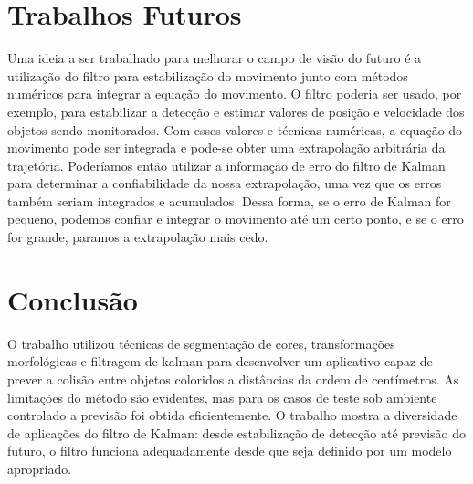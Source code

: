 \documentclass[journal]{IEEEtran}
\begin{document}
\section{Trabalhos Futuros}

Uma ideia a ser trabalhado para melhorar o campo de visão do futuro é a utilização
do filtro para estabilização do movimento junto com métodos numéricos para integrar
a equação do movimento. O filtro poderia ser usado, por exemplo, para estabilizar
a detecção e estimar valores de posição e velocidade dos objetos sendo monitorados.
Com esses valores e técnicas numéricas, a equação do movimento pode ser integrada
e pode-se obter uma extrapolação arbitrária da trajetória. Poderíamos então utilizar
a informação de erro do filtro de Kalman para determinar a confiabilidade da nossa
extrapolação, uma vez que os erros também seriam integrados e acumulados. Dessa forma,
se o erro de Kalman for pequeno, podemos confiar e integrar o movimento até um certo ponto, 
e se o erro for grande, paramos a extrapolação mais cedo.



\section{Conclusão}
O trabalho utilizou técnicas de segmentação de cores, transformações morfológicas
e filtragem de kalman para desenvolver um aplicativo capaz de prever a colisão entre
objetos coloridos a distâncias da ordem de centímetros. As limitações do método 
são evidentes, mas para os casos de teste sob ambiente controlado a previsão
foi obtida eficientemente. O trabalho mostra a diversidade de aplicações do filtro
de Kalman: desde estabilização de detecção até previsão do futuro, o filtro
funciona adequadamente desde que seja definido por um modelo apropriado.
\end{document}
